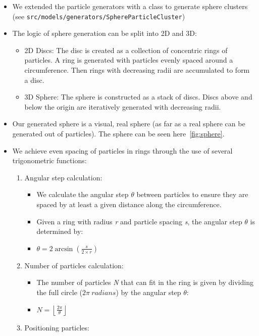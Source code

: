 \documentclass{article}
\begin{document}
\begin{itemize}
    \item We extended the particle generators with a class to generate sphere clusters (see \texttt{src/models/generators/SphereParticleCluster})
    \item The logic of sphere generation can be split into 2D and 3D:
    \begin{itemize}
        \item 2D Discs: The disc is created as a collection of concentric rings of particles. A ring is generated with particles evenly spaced around a circumference. Then rings with decreasing radii are accumulated to form a disc.
        \item 3D Sphere: The sphere is constructed as a stack of discs. Discs above and below the origin are iteratively generated with decreasing radii.
    \end{itemize}
    \item Our generated sphere is a visual, real sphere (as far as a real sphere can be generated out of particles). The sphere can be seen here\ \ref{fig:sphere}.
    \item We achieve even spacing of particles in rings through the use of several trigonometric functions:
    \begin{enumerate}
        \item Angular step calculation:
        \begin{itemize}
            \item We calculate the angular step $\theta$ between particles to ensure they are spaced by at least a given distance along the circumference.
            \item Given a ring with radius \textit{r} and particle spacing \textit{s}, the angular step $\theta$ is determined by:
            \item $\theta = 2 \arcsin\left(\frac{s}{2 \times r}\right)$
        \end{itemize}
        \item Number of particles calculation:
        \begin{itemize}
            \item The number of particles \textit{N} that can fit in the ring is given by dividing the full circle ($2\pi\ radians$) by the angular step $\theta$:
            \item $N = \left\lfloor \frac{2\pi}{\theta} \right\rfloor$
        \end{itemize}
        \item Positioning particles:

\end{enumerate}
\end{itemize}
\end{document}
